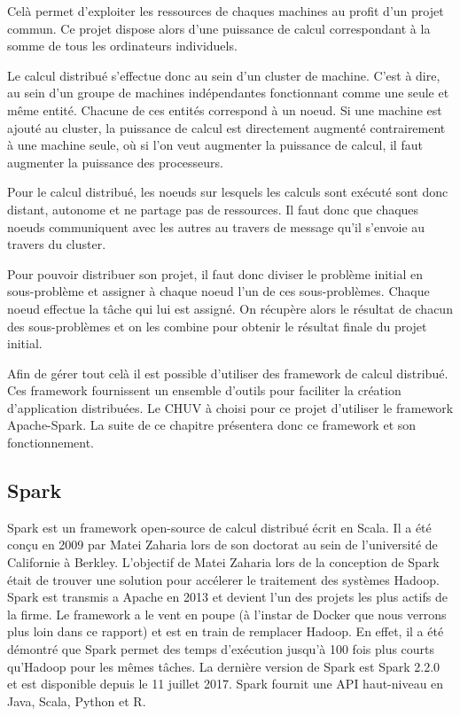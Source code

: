 \documentclass[a4paper,10pt,openany,oneside]{sphinxmanual}
\begin{document}
Celà permet d'exploiter les ressources de chaques machines au profit d'un projet commun. Ce projet dispose alors d'une puissance de
calcul correspondant à la somme de tous les ordinateurs individuels.

Le calcul distribué s'effectue donc au sein d'un cluster de machine. C'est à dire, au sein d'un groupe de machines indépendantes fonctionnant
comme une seule et même entité. Chacune de ces entités correspond à un noeud. Si une machine est ajouté au cluster, la puissance de calcul est
directement augmenté contrairement à une machine seule, où si l'on veut augmenter la puissance de calcul, il faut augmenter la puissance des
processeurs.

Pour le calcul distribué, les noeuds sur lesquels les calculs sont exécuté sont donc distant, autonome et ne partage pas de ressources. Il
faut donc que chaques noeuds communiquent avec les autres au travers de message qu'il s'envoie au travers du cluster.

Pour pouvoir distribuer son projet, il faut donc diviser le problème initial en sous-problème et assigner à chaque noeud l'un de ces sous-problèmes.
Chaque noeud effectue la tâche qui lui est assigné. On récupère alors le résultat de chacun des sous-problèmes et on les combine pour obtenir le
résultat finale du projet initial.

Afin de gérer tout celà il est possible d'utiliser des framework de calcul distribué. Ces framework fournissent un ensemble d'outils pour faciliter
la création d'application distribuées. Le CHUV à choisi pour ce projet d'utiliser le framework Apache-Spark. La suite de ce chapitre présentera donc
ce framework et son fonctionnement.


\subsection{Spark}
\label{index:spark}
Spark est un framework open-source de calcul distribué écrit en Scala. Il a été conçu en 2009 par Matei Zaharia lors de son doctorat au sein de l'université de Californie
à Berkley. L'objectif de Matei Zaharia lors de la conception de Spark était de trouver une solution pour accélerer le traitement des systèmes Hadoop. Spark
est transmis a Apache en 2013 et devient l'un des projets les plus actifs de la firme. Le framework a le vent en poupe (à l'instar de Docker que nous verrons
plus loin dans ce rapport) et est en train de remplacer Hadoop. En effet, il a été démontré que Spark permet des temps d'exécution jusqu'à 100 fois plus courts
qu'Hadoop pour les mêmes tâches. La dernière version de Spark est Spark 2.2.0 et est disponible depuis le 11 juillet 2017. Spark fournit une API haut-niveau en
Java, Scala, Python et R.
\end{document}
